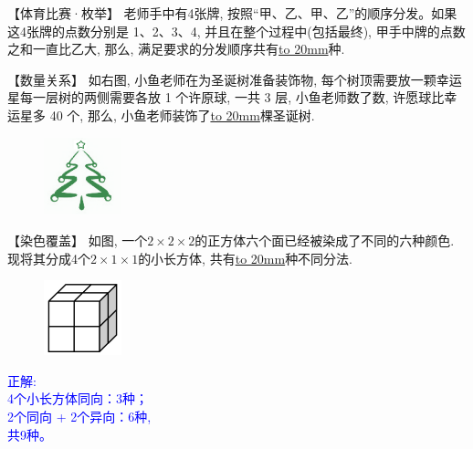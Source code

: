     
\item {
    【体育比赛·枚举】
    老师手中有4张牌, 按照``甲、乙、甲、乙''的顺序分发。如果这4张牌的点数分别是 1、2、3、4, 并且在整个过程中(包括最终), 甲手中牌的点数之和一直比乙大, 那么, 满足要求的分发顺序共有\underline{\hbox to 20mm{}}种.
    \vspace{1cm}
}

\item {
    【数量关系】
    如右图, 小鱼老师在为圣诞树准备装饰物, 每个树顶需要放一颗幸运星每一层树的两侧需要各放 1 个许原球, 一共 3 层, 小鱼老师数了数, 许愿球比幸运星多 40 个, 那么, 小鱼老师装饰了\underline{\hbox to 20mm{}}棵圣诞树.
    \begin{figure}[H] 
        \centering
        \includegraphics[width=0.2\textwidth]{./pics/Chapter_4/13.png}
    \end{figure}
}

\item {
    【染色覆盖】
    如图, 一个$2\times 2\times 2$的正方体六个面已经被染成了不同的六种颜色. 现将其分成4个$2\times 1\times 1$的小长方体, 共有\underline{\hbox to 20mm{}}种不同分法.
    \begin{figure}[H] 
        \centering
        \includegraphics[width=0.2\textwidth]{./pics/Chapter_4/15.png}
    \end{figure}
    \ifshowSolution 
        \fangsong{}\textcolor{blue}{
            正解: \\
            4个小长方体同向：3种；\\
            2个同向 + 2个异向：6种,\\
            共9种。
        }
    \else
        \vspace{1cm}
    \fi
}

